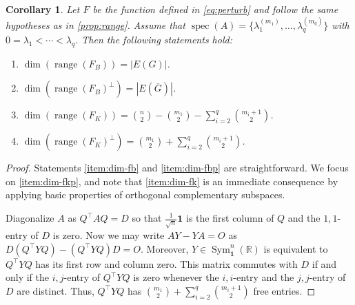 \documentclass{article}
\newtheorem{corollary}[theorem]{Corollary}
\theoremstyle{definition}
\newcommand{\trans}{^\top}
\newcommand{\bone}{\mathbf{1}}
\newcommand{\range}{\operatorname{range}}
\newcommand{\spec}{\operatorname{spec}}
\newcommand{\msymz}[1][n]{\operatorname{Sym}_{\bone}^{#1}(\mathbb{R})}
\begin{document}
\begin{corollary}
\label{cor:dim} 
Let $F$ be the function defined in \cref{eq:perturb} and follow the same hypotheses as in \cref{prop:range}.
Assume that $\spec(A) = \{\lambda_1^{(m_1)}, \ldots, \lambda_q^{(m_q)}\}$ with $0 = \lambda_1 < \cdots < \lambda_q$.  Then the following statements hold:
\begin{enumerate}[label={\rm(\arabic*)}]
\item $\dim(\range(F_B)) = |E(G)|$. \label{item:dim-fb}
\item $\dim(\range(F_B)^{\perp}) = |E(\overline{G})|$. \label{item:dim-fbp}
\item $\dim(\range(F_K)) = \binom{n}{2} - \binom{m_1}{2} - \sum_{i=2}^q\binom{m_i + 1}{2}$. \label{item:dim-fk}
\item $\dim(\range(F_K)^{\perp}) = \binom{m_1}{2} + \sum_{i=2}^q\binom{m_i + 1}{2}$. \label{item:dim-fkp}
\end{enumerate}
\end{corollary}
\begin{proof}
Statements \ref{item:dim-fb} and \ref{item:dim-fbp} are straightforward.  We focus on \ref{item:dim-fkp}, and note that \ref{item:dim-fk} is an immediate consequence by applying basic properties of orthogonal complementary subspaces.

Diagonalize $A$ as $Q\trans AQ = D$ so that $\frac{1}{\sqrt{n}}\bone$ is the first column of $Q$ and the $1,1$-entry of $D$ is zero.  Now we may write $AY - YA = O$ as $D(Q\trans YQ) - (Q\trans YQ)D = O$.  Moreover, $Y\in\msymz$ is equivalent to $Q\trans YQ$ has its first row and column zero.  This matrix commutes with $D$ if and only if the $i,j$-entry of $Q\trans YQ$ is zero whenever the $i,i$-entry and the $j,j$-entry of $D$ are distinct.  Thus, $Q\trans YQ$ has $\binom{m_1}{2} + \sum_{i=2}^q\binom{m_i + 1}{2}$ free entries.
\end{proof}
\end{document}
